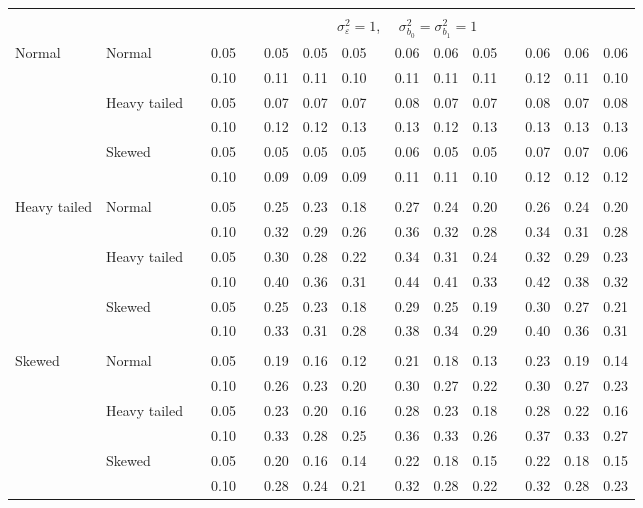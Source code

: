 \documentclass{article} %
\begin{document}
\begin{table}[ht]
\begin{scriptsize}
\begin{center}
\begin{tabular}{ll p{.1cm} c p{.1cm} rrr p{.1cm} rrr p{.1cm} rrr}
&&&&&&&&&&&&&&&\\
& && && \multicolumn{9}{c}{$\sigma_{\varepsilon}^2 = 1$, \ \ $\sigma_{b_0}^2 = \sigma_{b_1}^2 = 1$} \\ \cline{6-16}
\rowcolor{gray!20}Normal       & Normal       && 0.05 &&   0.05 & 0.05 & 0.05 && 0.06 & 0.06 & 0.05 &&  0.06 & 0.06 & 0.06 \\
\rowcolor{gray!20}             &              && 0.10 &&   0.11 & 0.11 & 0.10 && 0.11 & 0.11 & 0.11 &&  0.12 & 0.11 & 0.10 \\
\rowcolor{gray!20}             & Heavy tailed && 0.05 &&   0.07 & 0.07 & 0.07 && 0.08 & 0.07 & 0.07 &&  0.08 & 0.07 & 0.08 \\
\rowcolor{gray!20}             &              && 0.10 &&   0.12 & 0.12 & 0.13 && 0.13 & 0.12 & 0.13 &&  0.13 & 0.13 & 0.13 \\
\rowcolor{gray!20}             & Skewed       && 0.05 &&   0.05 & 0.05 & 0.05 && 0.06 & 0.05 & 0.05 &&  0.07 & 0.07 & 0.06 \\
\rowcolor{gray!20}             &              && 0.10 &&   0.09 & 0.09 & 0.09 && 0.11 & 0.11 & 0.10 &&  0.12 & 0.12 & 0.12 \\
             &&&&&&&&&&&&&&&\\
Heavy tailed & Normal       && 0.05 &&   0.25 & 0.23 & 0.18 && 0.27 & 0.24 & 0.20 &&  0.26 & 0.24 & 0.20 \\
             &              && 0.10 &&   0.32 & 0.29 & 0.26 && 0.36 & 0.32 & 0.28 &&  0.34 & 0.31 & 0.28 \\
             & Heavy tailed && 0.05 &&   0.30 & 0.28 & 0.22 && 0.34 & 0.31 & 0.24 &&  0.32 & 0.29 & 0.23 \\
             &              && 0.10 &&   0.40 & 0.36 & 0.31 && 0.44 & 0.41 & 0.33 &&  0.42 & 0.38 & 0.32 \\
             & Skewed       && 0.05 &&   0.25 & 0.23 & 0.18 && 0.29 & 0.25 & 0.19 &&  0.30 & 0.27 & 0.21 \\
             &              && 0.10 &&   0.33 & 0.31 & 0.28 && 0.38 & 0.34 & 0.29 &&  0.40 & 0.36 & 0.31 \\
             &&&&&&&&&&&&&&&\\
Skewed       & Normal       && 0.05 &&   0.19 & 0.16 & 0.12 && 0.21 & 0.18 & 0.13 && 0.23 & 0.19 & 0.14 \\
             &              && 0.10 &&   0.26 & 0.23 & 0.20 && 0.30 & 0.27 & 0.22 && 0.30 & 0.27 & 0.23 \\
             & Heavy tailed && 0.05 &&   0.23 & 0.20 & 0.16 && 0.28 & 0.23 & 0.18 && 0.28 & 0.22 & 0.16 \\
             &              && 0.10 &&   0.33 & 0.28 & 0.25 && 0.36 & 0.33 & 0.26 && 0.37 & 0.33 & 0.27 \\
             & Skewed       && 0.05 &&   0.20 & 0.16 & 0.14 && 0.22 & 0.18 & 0.15 && 0.22 & 0.18 & 0.15 \\
             &              && 0.10 &&   0.28 & 0.24 & 0.21 && 0.32 & 0.28 & 0.22 && 0.32 & 0.28 & 0.23 \\



\end{tabular}
\end{center}
\end{scriptsize}
\end{table}
\end{document}
